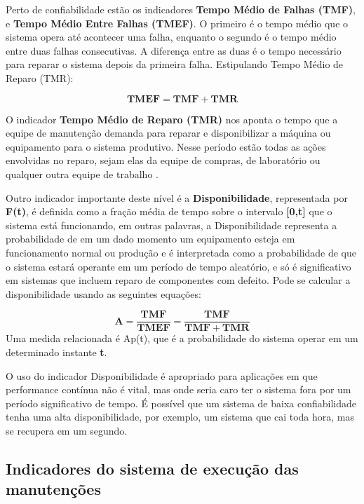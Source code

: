 Perto de confiabilidade estão os indicadores \textbf{Tempo Médio de Falhas (TMF)},  e \textbf{Tempo Médio Entre Falhas (TMEF)}. O primeiro é o tempo médio que o sistema opera até acontecer uma falha, enquanto o segundo é o tempo médio entre duas falhas consecutivas. A diferença entre as duas é o tempo necessário para reparar o sistema depois da primeira falha. Estipulando Tempo Médio de Reparo (TMR):

\begin{equation}
\label{eqn02}
	\mathbf{TMEF} = \mathbf{TMF} + \mathbf{TMR} 
\end{equation}

O indicador \textbf{Tempo Médio de Reparo (TMR)} nos aponta o tempo que a equipe de manutenção demanda para reparar e disponibilizar a máquina ou equipamento para o sistema produtivo. Nesse período estão todas as ações envolvidas no reparo, sejam elas da equipe de compras, de laboratório ou qualquer outra equipe de trabalho \cite{ZEN2008}.

Outro indicador importante deste nível é a \textbf{Disponibilidade}, representada por \textbf{F(t)}, é definida como a fração média de tempo sobre o intervalo \textbf{[0,t]} que o sistema está funcionando, em outras palavras, a Disponibilidade representa a probabilidade de em um dado momento um equipamento esteja em funcionamento normal ou produção e é interpretada como a probabilidade de que o sistema estará operante em um período de tempo aleatório, e só é significativo em sistemas que incluem reparo de componentes com defeito. Pode se calcular a disponibilidade usando as seguintes equações:

\begin{equation}
\label{eqn03}
	\mathbf{A} = \mathbf{\frac{TMF}{TMEF}} = \mathbf{\frac{TMF}{TMF + TMR}}
\end{equation}
Uma medida relacionada é Ap(t), que é a probabilidade do sistema operar em um determinado instante \textbf{t}.

O uso do indicador Disponibilidade é apropriado para aplicações em que performance contínua não é vital, mas onde seria caro ter o sistema fora por um período significativo de tempo. É possível que um sistema de baixa confiabilidade tenha uma alta disponibilidade, por exemplo, um sistema que cai toda hora, mas se recupera em um segundo.

\subsection{Indicadores do sistema de execução das manutenções}
\label{nivel 2}

